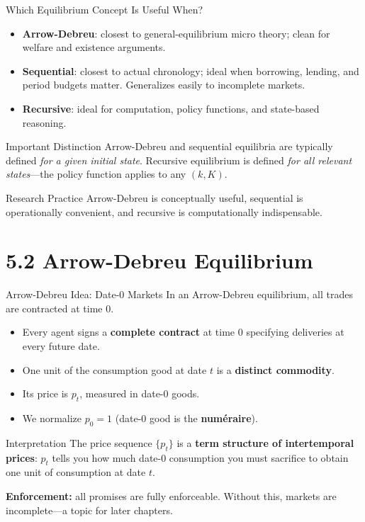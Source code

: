 \documentclass[aspectratio=169,10pt]{beamer}
\begin{document}
\begin{frame}{Which Equilibrium Concept Is Useful When?}
\begin{itemize}
  \item \textbf{Arrow-Debreu}: closest to general-equilibrium micro theory; clean for welfare and existence arguments.
  \item \textbf{Sequential}: closest to actual chronology; ideal when borrowing, lending, and period budgets matter. Generalizes easily to incomplete markets.
  \item \textbf{Recursive}: ideal for computation, policy functions, and state-based reasoning.
\end{itemize}

\begin{block}{Important Distinction}
Arrow-Debreu and sequential equilibria are typically defined \emph{for a given initial state}. Recursive equilibrium is defined \emph{for all relevant states}---the policy function applies to any $(k,K)$.
\end{block}

\begin{block}{Research Practice}
Arrow-Debreu is conceptually useful, sequential is operationally convenient, and recursive is computationally indispensable.
\end{block}
\end{frame}

\section{5.2 Arrow-Debreu Equilibrium}

\begin{frame}{Arrow-Debreu Idea: Date-0 Markets}
In an Arrow-Debreu equilibrium, all trades are contracted at time 0.

\medskip
\begin{itemize}
  \item Every agent signs a \textbf{complete contract} at time 0 specifying deliveries at every future date.
  \item One unit of the consumption good at date $t$ is a \textbf{distinct commodity}.
  \item Its price is $p_t$, measured in date-0 goods.
  \item We normalize $p_0=1$ (date-0 good is the \textbf{num\'eraire}).
\end{itemize}

\begin{block}{Interpretation}
The price sequence $\{p_t\}$ is a \textbf{term structure of intertemporal prices}: $p_t$ tells you how much date-0 consumption you must sacrifice to obtain one unit of consumption at date $t$.
\end{block}

\medskip
\textbf{Enforcement:} all promises are fully enforceable. Without this, markets are incomplete---a topic for later chapters.
\end{frame}
\end{document}
